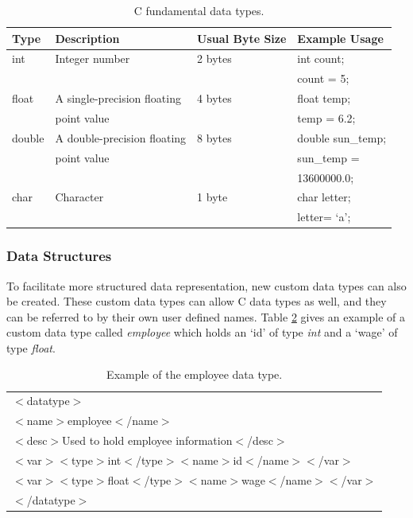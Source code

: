 \documentclass[a4paper,11pt]{article}
\begin{document}
\begin{table}[hbtp]
\centering
\begin{tabular}{|l|l|l|l|}
\hline
Type & Description & Usual Byte Size & Example Usage\\
\hline \hline
int & Integer number & 2 bytes & int count;\\
& & & count = 5;\\
\hline
float & A single-precision floating & 4 bytes & float temp;\\
&  point value & & temp = 6.2;\\
\hline
double & A double-precision floating & 8 bytes & double sun\_temp;\\
&  point value & & sun\_temp =\\
&&&13600000.0;\\
\hline
char & Character & 1 byte & char letter;\\
& & & letter= `a';\\
\hline
\end{tabular}
\caption{C fundamental data types.} \label{tab:cdata}
\end{table}

\subsubsection{Data Structures}
To facilitate more structured data representation, new custom data
types can also be created. These custom data types can allow C data
types as well, and they can be referred to by their own user defined
names. Table \ref{tab:empdata} gives an example of a custom data
type called \emph{employee} which holds an `id' of type \emph{int}
and a `wage' of type \emph{float}.

\begin{table}
\centering %
\begin{tabular}{|l|}
\hline
$<$datatype$>$\\
$<$name$>$employee$<$/name$>$ \\
$<$desc$>$Used to hold employee information$<$/desc$>$\\
$<$var$><$type$>$int$<$/type$><$name$>$id$<$/name$><$/var$>$\\
$<$var$><$type$>$float$<$/type$><$name$>$wage$<$/name$><$/var$>$\\ $<$/datatype$>$\\
\hline
\end{tabular}
\caption{Example of the employee data type.} \label{tab:empdata}
\end{table}
\end{document}

